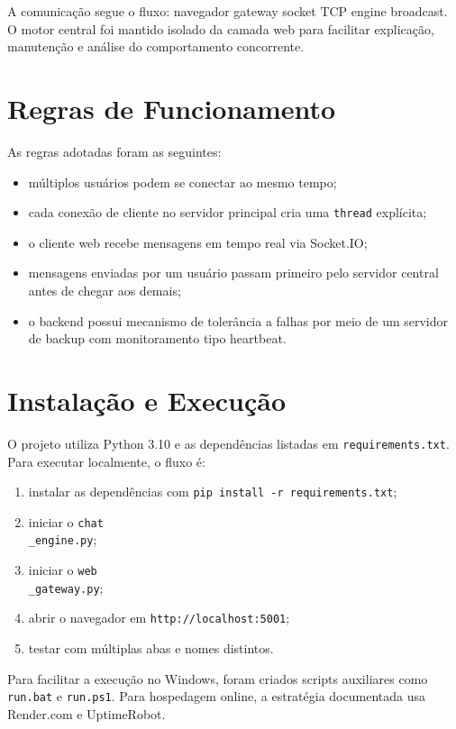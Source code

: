 \documentclass[12pt,a4paper]{article}
\begin{document}
A comunicação segue o fluxo: navegador \textrightarrow{} gateway \textrightarrow{} socket TCP \textrightarrow{} engine \textrightarrow{} broadcast. O motor central foi mantido isolado da camada web para facilitar explicação, manutenção e análise do comportamento concorrente.

\section{Regras de Funcionamento}

As regras adotadas foram as seguintes:

\begin{itemize}
    \item múltiplos usuários podem se conectar ao mesmo tempo;
    \item cada conexão de cliente no servidor principal cria uma \texttt{thread} explícita;
    \item o cliente web recebe mensagens em tempo real via Socket.IO;
    \item mensagens enviadas por um usuário passam primeiro pelo servidor central antes de chegar aos demais;
    \item o backend possui mecanismo de tolerância a falhas por meio de um servidor de backup com monitoramento tipo heartbeat.
\end{itemize}

\section{Instalação e Execução}

O projeto utiliza Python 3.10 e as dependências listadas em \texttt{requirements.txt}. Para executar localmente, o fluxo é:

\begin{enumerate}
    \item instalar as dependências com \texttt{pip install -r requirements.txt};
    \item iniciar o \texttt{chat\\_engine.py};
    \item iniciar o \texttt{web\\_gateway.py};
    \item abrir o navegador em \texttt{http://localhost:5001};
    \item testar com múltiplas abas e nomes distintos.
\end{enumerate}

Para facilitar a execução no Windows, foram criados scripts auxiliares como \texttt{run.bat} e \texttt{run.ps1}. Para hospedagem online, a estratégia documentada usa Render.com e UptimeRobot.
\end{document}
